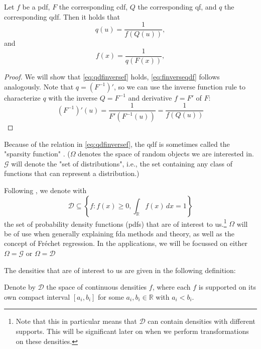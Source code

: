 \begin{lemma}
\label{lemma:f eq inverse qdf}
    Let \(f\) be a pdf, \(F\) the corresponding cdf, \(Q\) the corresponding qf, and
    \(q\) the corresponding qdf. Then it holds that
    \begin{equation}
    \label{eq:qdfinversef}
        {q}(u) = \frac{1}{{f}({Q}(u))},
    \end{equation}
    and
    \begin{equation}
    \label{eq:finverseqdf}
        {f}(x) = \frac{1}{{q}({F}(x))},
    \end{equation}
\end{lemma}
\begin{proof}
    We will show that \eqref{eq:qdfinversef} holds, \eqref{eq:finverseqdf} follows
    analogously. Note that \( q = (F^{-1})' \), so we can use the inverse function
    rule to characterize \(q \) with the inverse $Q = F^{-1}$ and derivative $f = F'$
    of \( F \):
    \begin{equation}
    \label{eq:proof_qdfinversef}
        (F^{-1})'(u) = \frac{1}{{F'}({F^{-1}}(u))} = \frac{1}{{f}({Q}(u))}
    \end{equation}
\end{proof}
Because of the relation in \eqref{eq:qdfinversef}, the qdf is sometimes called the
"sparsity function" \parencite[cf.][]{Tukey1965}.
($\Omega$ denotes the space of random objects
we are interested in. $\mathcal{G}$ will denote the "set of distributions", i.e., the set containing
any class of functions that can represent a distribution.)

Following \textcite{PetersenZhangKokoszka2022}, we denote with
\begin{equation}
\label{eq:density_set}
    \mathcal{D} \subseteq \left\{ f : f(x) \geq 0, \int_{\mathbb{R}} f(x) \, dx = 1 \right\}
\end{equation}
the set of probability density functions (pdfs) that are of interest to us.\footnote{Note that
this in particular means that $\mathcal{D}$ can contain densities with different supports.
This will be significant later on when we perform transformations on these densities.}
$\Omega$ will be of use when generally explaining fda methods and theory, as well as
the concept of Fréchet regression. In the applications, we will be focussed on either
$\Omega = \mathcal{G}$ or $\Omega = \mathcal{D}$

The densities that are of interest to us are given in the following definition:
\begin{definition}
    Denote by $\mathcal{D}$ the space of continuous densities $f$, where each
    $f$ is supported on its own compact interval $[a_i, b_i]$ for some $a_i, b_i \in
    \mathbb{R}$ with $a_i < b_i$.
\end{definition}

